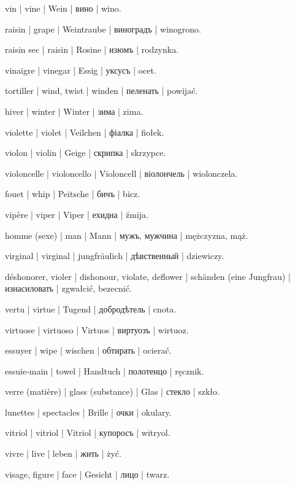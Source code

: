 \begin{outdent}{1em}
vin | vine | Wein | вино | wino.

\uvsubentry{}
raisin | grape | Weintraube | виноградъ | winogrono.


\uvsubentry{}
raisin sec | raisin | Rosine | изюмъ | rodzynka.

vinaigre | vinegar | Essig | уксусъ | ocet.

tortiller | wind, twist | winden | пеленать | powijać.

hiver | winter | Winter | зима | zima.

violette | violet | Veilchen | фіалка | fiołek.

violon | violin | Geige | скрипка | skrzypce.

violoncelle | violoncello | Violoncell | віолончель | wiolonczela.

fouet | whip | Peitsche | бичъ | bicz.

vipère | viper | Viper | ехидна | źmija.

homme (sexe) | man | Mann | мужъ, мужчина | mężczyzna, mąż.

virginal | virginal | jungfräulich | дѣвственный | dziewiczy.

\uvsubentry{}
déshonorer, violer | dishonour, violate, deflower | schänden (eine Jungfrau) | изнасиловать | zgwałcić, bezecnić.

vertu | virtue | Tugend | добродѣтель | cnota.

virtuose | virtuoso | Virtuos | виртуозъ | wirtuoz.

essuyer | wipe | wischen | обтирать | ocierać.

\uvsubentry{}
essuie-main | towel | Handtuch | полотенцо | ręcznik.

verre (matière) | glass (substance) | Glas | стекло | szkło.

\uvsubentry{}
lunettes | spectacles | Brille | очки | okulary.

vitriol | vitriol | Vitriol | купоросъ | witryol.

vivre | live | leben | жить | żyć.

visage, figure | face | Gesicht | лицо | twarz.


\end{outdent}

